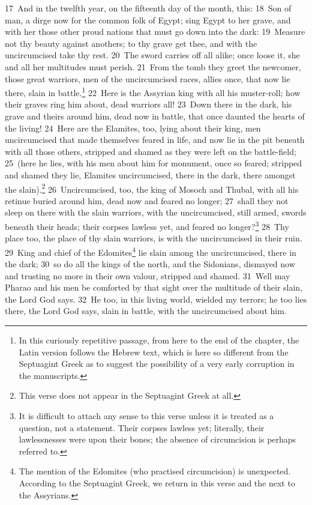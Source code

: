 \documentclass[10pt]{book} %
\begin{document}
\textcolor{benred8}{17}~And in the twelfth year, on the fifteenth day of the month, this: \textcolor{benred8}{18}~Son of man, a dirge now for the common folk of Egypt; sing Egypt to her grave, and with her those other proud nations that must go down into the dark: \textcolor{benred8}{19}~Measure not thy beauty against another\textquotesingle s; to thy grave get thee, and with the uncircumcised take thy rest. \textcolor{benred8}{20}~The sword carries off all alike; once loose it, she and all her multitudes must perish. \textcolor{benred8}{21}~From the tomb they greet the newcomer, those great warriors, men of the uncircumcised races, allies once, that now lie there, slain in battle.\footnote[1]{In this curiously repetitive passage, from here to the end of the chapter, the Latin version follows the Hebrew text, which is here so different from the Septuagint Greek as to suggest the possibility of a very early corruption in the manuscripts.} \textcolor{benred8}{22}~Here is the Assyrian king with all his muster-roll; how their graves ring him about, dead warriors all! \textcolor{benred8}{23}~Down there in the dark, his grave and theirs around him, dead now in battle, that once daunted the hearts of the living! \textcolor{benred8}{24}~Here are the Elamites, too, lying about their king, men uncircumcised that made themselves feared in life, and now lie in the pit beneath with all those others, stripped and shamed as they were left on the battle-field; \textcolor{benred8}{25}~(here he lies, with his men about him for monument, once so feared; stripped and shamed they lie, Elamites uncircumcised, there in the dark, there amongst the slain).\footnote[2]{This verse does not appear in the Septuagint Greek at all.} \textcolor{benred8}{26}~Uncircumcised, too, the king of Mosoch and Thubal, with all his retinue buried around him, dead now and feared no longer; \textcolor{benred8}{27}~shall they not sleep on there with the slain warriors, with the uncircumcised, still armed, swords beneath their heads; their corpses lawless yet, and feared no longer?\footnote[3]{It is difficult to attach any sense to this verse unless it is treated as a question, not a statement. \textasciigrave Their corpses lawless yet\textquotesingle ; literally, \textasciigrave their lawlessnesses were upon their bones\textquotesingle ; the absence of circumcision is perhaps referred to.} \textcolor{benred8}{28}~Thy place too, the place of thy slain warriors, is with the uncircumcised in their ruin. \textcolor{benred8}{29}~King and chief of the Edomites\footnote[4]{The mention of the Edomites (who practised circumcision) is unexpected. According to the Septuagint Greek, we return in this verse and the next to the Assyrians.} lie slain among the uncircumcised, there in the dark; \textcolor{benred8}{30}~so do all the kings of the north, and the Sidonians, dismayed now and trusting no more in their own valour, stripped and shamed. \textcolor{benred8}{31}~Well may Pharao and his men be comforted by that sight over the multitude of their slain, the Lord God says. \textcolor{benred8}{32}~He too, in this living world, wielded my terrors; he too lies there, the Lord God says, slain in battle, with the uncircumcised about him.
\end{document}

